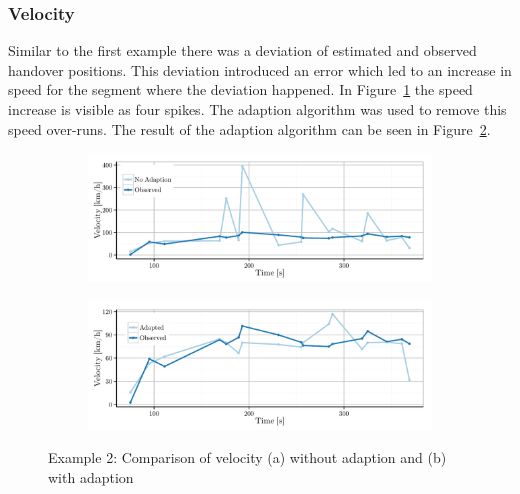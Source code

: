 \documentclass[master,english]{hgbthesis}
\begin{document}
\subsubsection{Velocity}
Similar to the first example there was a deviation of estimated and observed handover positions. This deviation introduced an error which led to an increase in speed for the segment where the deviation happened. In Figure~\ref{fig:1058_velocityNoAdapt} the speed increase is visible as four spikes. The adaption algorithm was used to remove this speed over-runs. The result of the adaption algorithm can be seen in Figure~\ref{fig:1058_velocityAdapt}.
\begin{figure}
	\centering
	\begin{subfigure}[b]{\textwidth}
		\includegraphics[width=\textwidth]{./images/1058_velocityNoAdapt}
		\caption{}
		\label{fig:1058_velocityNoAdapt}
	\end{subfigure}%
	\begin{subfigure}[b]{\textwidth}
		\includegraphics[width=\textwidth]{./images/1058_velocityAdapt}
		\caption{}
		\label{fig:1058_velocityAdapt}
	\end{subfigure}
	\caption{Example 2: Comparison of velocity (a) without adaption  and (b) with adaption}\label{fig:1058velocity}
\end{figure}
\end{document}
